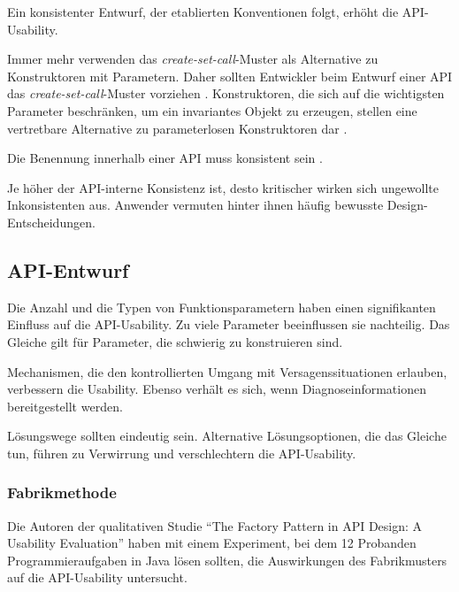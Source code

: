 Ein konsistenter Entwurf, der etablierten Konventionen folgt, erhöht die API-Usability. \citep{Zibran:2011fx}

Immer mehr  verwenden das \textit{create-set-call}-Muster als Alternative zu Konstruktoren mit Parametern. Daher sollten Entwickler beim Entwurf einer API das \textit{create-set-call}-Muster vorziehen \citep{Stylos:2007jb}. Konstruktoren, die sich auf die wichtigsten Parameter beschränken, um ein invariantes Objekt zu erzeugen, stellen eine vertretbare Alternative zu parameterlosen Konstruktoren dar \cite{Piccioni:2013uq}.

Die Benennung innerhalb einer API muss konsistent sein \citep{Bloch:2006jk,Briand:1997fw,Zibran:2011fx,McLellan:1998cu}.

Je höher der API-interne Konsistenz ist, desto kritischer wirken sich ungewollte Inkonsistenten aus. Anwender vermuten hinter ihnen häufig bewusste Design-Entscheidungen. \citep{Watson:2009da}


\subsection{API-Entwurf}

Die Anzahl und die Typen von Funktionsparametern haben einen signifikanten Einfluss auf die API-Usability. Zu viele Parameter beeinflussen sie nachteilig. Das Gleiche gilt für Parameter, die schwierig zu konstruieren sind. \citep{Zibran:2011fx}

Mechanismen, die den kontrollierten Umgang mit Versagenssituationen erlauben, verbessern die Usability. Ebenso verhält es sich, wenn Diagnoseinformationen bereitgestellt werden. \citep{Zibran:2011fx}

Lösungswege sollten eindeutig sein. Alternative Lösungsoptionen, die das Gleiche tun, führen zu Verwirrung und verschlechtern die API-Usability. \cite{Piccioni:2013uq,Zibran:2011fx}



\subsubsection{Fabrikmethode}

Die Autoren der qualitativen Studie ``The Factory Pattern in API Design: A Usability Evaluation'' \citep{Ellis:2007kv} haben mit einem Experiment, bei dem 12 Probanden Programmieraufgaben in Java lösen sollten, die Auswirkungen des Fabrikmusters auf die API-Usability untersucht.

